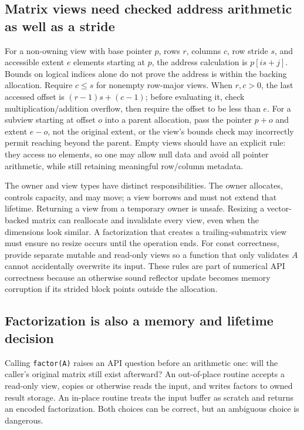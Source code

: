 \subsection{Matrix views need checked address arithmetic as well as a stride}\label{matrix-views-need-checked-address-arithmetic-as-well-as-a-stride}

For a non-owning view with base pointer \(p\), rows \(r\), columns \(c\), row stride \(s\), and accessible extent \(e\) elements starting at \(p\), the address calculation is \(p[i s+j]\). Bounds on logical indices alone do not prove the address is within the backing allocation. Require \(c\le s\) for nonempty row-major views. When \(r,c>0\), the last accessed offset is \((r-1)s+(c-1)\); before evaluating it, check multiplication/addition overflow, then require the offset to be less than \(e\). For a subview starting at offset \(o\) into a parent allocation, pass the pointer \(p+o\) and extent \(e-o\), not the original extent, or the view's bounds check may incorrectly permit reaching beyond the parent. Empty views should have an explicit rule: they access no elements, so one may allow null data and avoid all pointer arithmetic, while still retaining meaningful row/column metadata.

The owner and view types have distinct responsibilities. The owner allocates, controls capacity, and may move; a view borrows and must not extend that lifetime. Returning a view from a temporary owner is unsafe. Resizing a vector-backed matrix can reallocate and invalidate every view, even when the dimensions look similar. A factorization that creates a trailing-submatrix view must ensure no resize occurs until the operation ends. For const correctness, provide separate mutable and read-only views so a function that only validates \(A\) cannot accidentally overwrite its input. These rules are part of numerical API correctness because an otherwise sound reflector update becomes memory corruption if its strided block points outside the allocation.

\subsection{Factorization is also a memory and lifetime decision}\label{factorization-is-also-a-memory-and-lifetime-decision}

Calling \texttt{factor(A)} raises an API question before an arithmetic one: will the caller's original matrix still exist afterward? An out-of-place routine accepts a read-only view, copies or otherwise reads the input, and writes factors to owned result storage. An in-place routine treats the input buffer as scratch and returns an encoded factorization. Both choices can be correct, but an ambiguous choice is dangerous.

